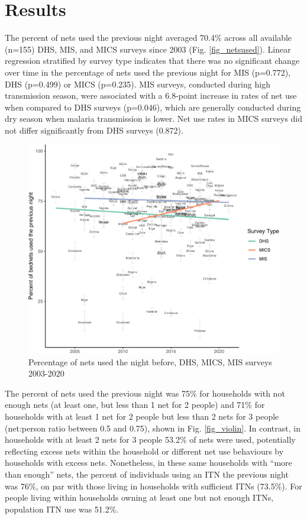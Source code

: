 \documentclass[review,
3p]{elsarticle} %
\begin{document}
\hypertarget{results}{%
\section{Results}\label{results}}

The percent of nets used the previous night averaged 70.4\% across all
available (n=155) DHS, MIS, and MICS surveys since 2003 (Fig.
\ref{fig_netsused}). Linear regression stratified by survey type
indicates that there was no significant change over time in the
percentage of nets used the previous night for MIS (p=0.772), DHS
(p=0.499) or MICS (p=0.235). MIS surveys, conducted during high
transmission season, were associated with a 6.8-point increase in rates
of net use when compared to DHS surveys (p=0.046), which are generally
conducted during dry season when malaria transmission is lower. Net use
rates in MICS surveys did not differ significantly from DHS surveys
(0.872).

\begin{figure}

{\centering \includegraphics[width=0.8\linewidth]{reasons_paper_files/figure-latex/fig_netsused-1} 

}

\caption{\label{fig_netsused}Percentage of nets used the night before, DHS, MICS, MIS surveys 2003-2020}\label{fig:fig_netsused}
\end{figure}

The percent of nets used the previous night was 75\% for households with
not enough nets (at least one, but less than 1 net for 2 people) and
71\% for households with at least 1 net for 2 people but less than 2
nets for 3 people (net:person ratio between 0.5 and 0.75), shown in Fig.
\ref{fig_violin}. In contrast, in households with at least 2 nets for 3
people 53.2\% of nets were used, potentially reflecting excess nets
within the household or different net use behaviours by households with
excess nets. Nonetheless, in these same households with ``more than
enough'' nets, the percent of individuals using an ITN the previous
night was 76\%, on par with those living in households with sufficient
ITNs (73.5\%). For people living within households owning at least one
but not enough ITNs, population ITN use was 51.2\%.
\end{document}
